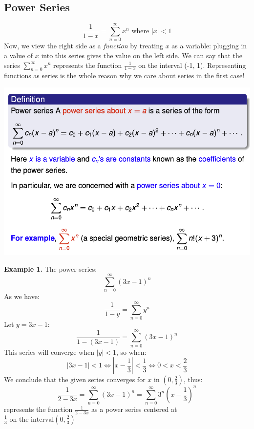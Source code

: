\documentclass{article}
\begin{document}
\subsection{Power Series}
$$\frac{1}{1-x} = \sum_{n=0}^{\infty}x^n \text{ where } |x| < 1$$
Now, we view the right side as a \textit{function} by treating $x$ as a variable: plugging in a value of $x$ into this series gives the value on the left side. We can say that the series $\sum_{n=0}^{\infty}x^n$ represents the function $\frac{1}{1-x}$ on the interval (-1, 1). Representing functions as series is the whole reason why we care about series in the first case! \\
\begin{center}
        \includegraphics[scale = 0.7]{power series - def.png}
    \end{center} 
\textbf{Example 1.} The power series: 
$$ \sum_{n=0}^{\infty} (3x-1)^n$$
As we have: 
$$ \frac{1}{1-y} = \sum_{n=0}^{\infty} y^n$$ Let $y=3x-1$:
$$\frac{1}{1-(3x-1)} = \sum_{n=0}^{\infty} (3x-1)^n$$
This series will converge when $|y| < 1$, so when: 
$$ |3x - 1| < 1 \Leftrightarrow 
\left|x - \frac{1}{3} \right| < \frac{1}{3} \Leftrightarrow 0 < x < \frac{2}{3}$$
We conclude that the given series converges for $ x \text{ in }\left(0, \frac{2}{3}\right)$, thus: 
$$ \frac{1}{2-3x} = \sum_{n=0}^{\infty} (3x - 1)^n = \sum_{n=0}^{\infty} 3^n \left(x-\frac{1}{3} \right)^n $$
represents the function $\frac{1}{2-3x}$ as a power series centered at $\frac{1}{3} \text{ on the interval} \left(0, \frac{2}{3}\right)$
\end{document}
